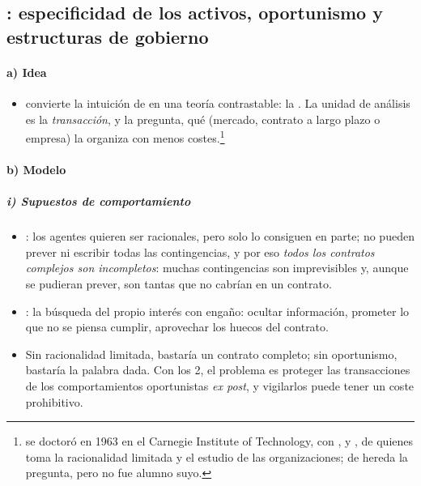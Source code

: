 \documentclass[11pt]{article}
\begin{document}
\subsection{: especificidad de los activos, oportunismo y estructuras de gobierno}\label{sec:williamson}

\paragraph{a) Idea}

\begin{itemize}
\item \textcite{Williamson1975Markets,Williamson1985Economic} convierte la intuición de  en una teoría contrastable: la . La unidad de análisis es la \emph{transacción}, y la pregunta, qué  (mercado, contrato a largo plazo o empresa) la organiza con menos costes.\footnote{ se doctoró en 1963 en el Carnegie Institute of Technology, con ,  y , de quienes toma la racionalidad limitada y el estudio de las organizaciones\nocite{Nobel2009WilliamsonBio}; de  hereda la pregunta, pero no fue alumno suyo.}
\end{itemize}

\paragraph{b) Modelo}

\subparagraph{i) Supuestos de comportamiento}

\begin{itemize}
\item {}\nocite{Simon1955Behavioral}: los agentes quieren ser racionales, pero solo lo consiguen en parte; no pueden prever ni escribir todas las contingencias, y por eso \emph{todos los contratos complejos son incompletos}: muchas contingencias son imprevisibles y, aunque se pudieran prever, son tantas que no cabrían en un contrato.
\item {}: la búsqueda del propio interés con engaño: ocultar información, prometer lo que no se piensa cumplir, aprovechar los huecos del contrato.
\item Sin racionalidad limitada, bastaría un contrato completo; sin oportunismo, bastaría la palabra dada. Con los 2, el problema es proteger las transacciones de los comportamientos oportunistas \emph{ex post}, y vigilarlos puede tener un coste prohibitivo.
\end{itemize}
\end{document}
